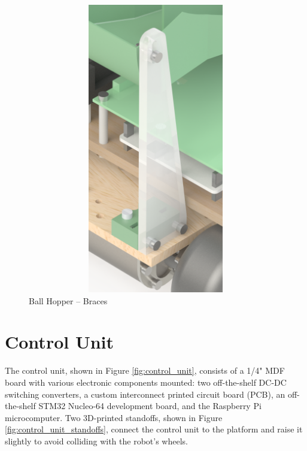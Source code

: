 \begin{figure}[H]   %
	\centering \includegraphics[width=6in, height=5in, keepaspectratio]{figures/hopper_brace.png}
	\caption{Ball Hopper -- Braces}	\label{fig:hopper_brace}
\end{figure}

\section{Control Unit}
The control unit, shown in Figure \ref{fig:control_unit}, consists of a 1/4" MDF board with various electronic components mounted: two off-the-shelf DC-DC switching converters, a custom interconnect printed circuit board (PCB), an off-the-shelf STM32 Nucleo-64 development board, and the Raspberry Pi microcomputer. Two 3D-printed standoffs, shown in Figure \ref{fig:control_unit_standoffs}, connect the control unit to the platform and raise it slightly to avoid colliding with the robot's wheels. 

